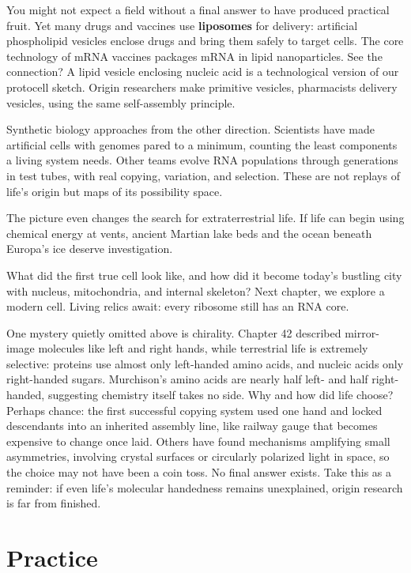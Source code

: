You might not expect a field without a final answer to have produced practical fruit. Yet many drugs and vaccines use \textbf{liposomes} for delivery: artificial phospholipid vesicles enclose drugs and bring them safely to target cells. The core technology of mRNA vaccines packages mRNA in lipid nanoparticles. See the connection? A lipid vesicle enclosing nucleic acid is a technological version of our protocell sketch. Origin researchers make primitive vesicles, pharmacists delivery vesicles, using the same self-assembly principle.

Synthetic biology approaches from the other direction. Scientists have made artificial cells with genomes pared to a minimum, counting the least components a living system needs. Other teams evolve RNA populations through generations in test tubes, with real copying, variation, and selection. These are not replays of life's origin but maps of its possibility space.

The picture even changes the search for extraterrestrial life. If life can begin using chemical energy at vents, ancient Martian lake beds and the ocean beneath Europa's ice deserve investigation.

What did the first true cell look like, and how did it become today's bustling city with nucleus, mitochondria, and internal skeleton? Next chapter, we explore a modern cell. Living relics await: every ribosome still has an RNA core.

\begin{tiaozhan}
One mystery quietly omitted above is chirality. Chapter 42 described mirror-image molecules like left and right hands, while terrestrial life is extremely selective: proteins use almost only left-handed amino acids, and nucleic acids only right-handed sugars. Murchison's amino acids are nearly half left- and half right-handed, suggesting chemistry itself takes no side. Why and how did life choose? Perhaps chance: the first successful copying system used one hand and locked descendants into an inherited assembly line, like railway gauge that becomes expensive to change once laid. Others have found mechanisms amplifying small asymmetries, involving crystal surfaces or circularly polarized light in space, so the choice may not have been a coin toss. No final answer exists. Take this as a reminder: if even life's molecular handedness remains unexplained, origin research is far from finished.
\end{tiaozhan}

\section*{Practice}

